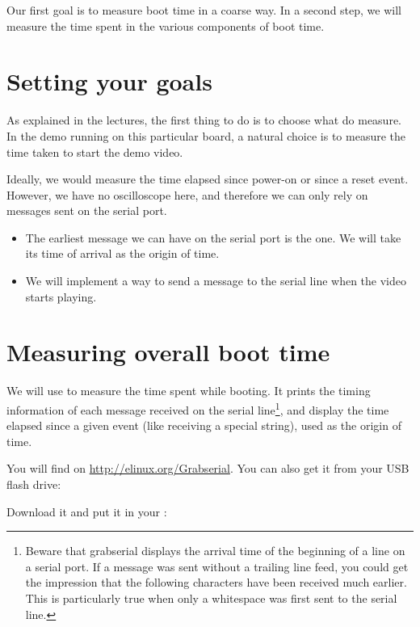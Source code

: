
Our first goal is to measure boot time in a coarse way. In a second
step, we will measure the time spent in the various components of boot
time.

\section{Setting your goals}

As explained in the lectures, the first thing to do is to choose what do
measure. In the demo running on this particular board, a natural choice is to 
measure the time taken to start the demo video.

Ideally, we would measure the time elapsed since power-on or since a
reset event. However, we have no oscilloscope here, and therefore we can only
rely on messages sent on the serial port.

\begin{itemize}
\item The earliest message we can have on the serial port is the
       one. We will take its time of arrival as the origin of
      time.
\item We will implement a way to send a message to the serial line when
      the video starts playing.
\end{itemize}

\section{Measuring overall boot time}

We will use  to measure the time spent while booting.
It prints the timing information of each message received on the
serial line\footnote{Beware that grabserial displays the arrival time
of the beginning of a line on a serial port. If a message was sent
without a trailing line feed, you could get the impression that
the following characters have been received much earlier. This is
particularly true when only a whitespace was first sent to the
serial line.}, and display the time elapsed since a given event (like
receiving a special string), used as the origin of time.

You will find  on \url{http://elinux.org/Grabserial}.
You can also get it from your USB flash drive:

Download it and put it in your :

